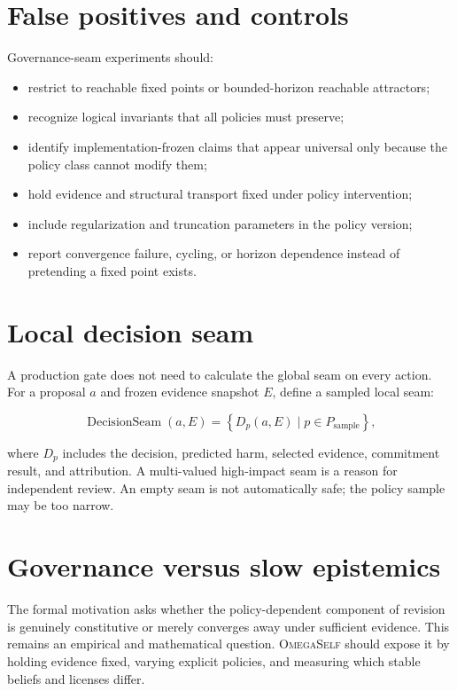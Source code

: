 \documentclass[11pt,oneside]{report}
\newcommand{\systemname}{\textsc{OmegaSelf}}
\begin{document}
\section{False positives and controls}

Governance-seam experiments should:

\begin{itemize}
  \item restrict to reachable fixed points or bounded-horizon reachable attractors;
  \item recognize logical invariants that all policies must preserve;
  \item identify implementation-frozen claims that appear universal only because the policy class cannot modify them;
  \item hold evidence and structural transport fixed under policy intervention;
  \item include regularization and truncation parameters in the policy version;
  \item report convergence failure, cycling, or horizon dependence instead of pretending a fixed point exists.
\end{itemize}

\section{Local decision seam}

A production gate does not need to calculate the global seam on every action. For a proposal $a$ and frozen evidence snapshot $E$, define a sampled local seam:

\[
\operatorname{DecisionSeam}(a,E)
=\left\{D_p(a,E)\mid p\in P_{\mathrm{sample}}\right\},
\]

where $D_p$ includes the decision, predicted harm, selected evidence, commitment result, and attribution. A multi-valued high-impact seam is a reason for independent review. An empty seam is not automatically safe; the policy sample may be too narrow.

\section{Governance versus slow epistemics}

The formal motivation asks whether the policy-dependent component of revision is genuinely constitutive or merely converges away under sufficient evidence. This remains an empirical and mathematical question. \systemname{} should expose it by holding evidence fixed, varying explicit policies, and measuring which stable beliefs and licenses differ.
\end{document}
